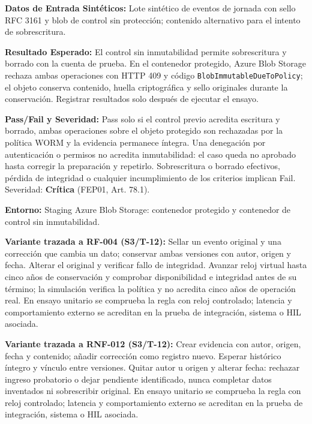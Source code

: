 \par\noindent\textbf{Datos de Entrada Sintéticos:} Lote sintético de eventos de jornada con sello RFC 3161 y blob de control sin protección; contenido alternativo para el intento de sobrescritura.\par
\par\noindent\textbf{Resultado Esperado:} El control sin inmutabilidad permite sobrescritura y borrado con la cuenta de prueba. En el contenedor protegido, Azure Blob Storage rechaza ambas operaciones con HTTP 409 y código \texttt{Blob\allowbreak{}Immutable\allowbreak{}Due\allowbreak{}To\allowbreak{}Policy}; el objeto conserva contenido, huella criptográfica y sello originales durante la conservación. Registrar resultados solo después de ejecutar el ensayo.\par
\par\noindent\textbf{Pass/Fail y Severidad:} Pass solo si el control previo acredita escritura y borrado, ambas operaciones sobre el objeto protegido son rechazadas por la política WORM y la evidencia permanece íntegra. Una denegación por autenticación o permisos no acredita inmutabilidad: el caso queda no aprobado hasta corregir la preparación y repetirlo. Sobrescritura o borrado efectivos, pérdida de integridad o cualquier incumplimiento de los criterios implican Fail. Severidad: \textbf{Crítica} (FEP01, Art. 78.1).\par
\par\noindent\textbf{Entorno:} Staging Azure Blob Storage: contenedor protegido y contenedor de control sin inmutabilidad.\par




\par\noindent\textbf{Variante trazada a RF-004 (S3/T-12):} Sellar un evento original y una corrección que cambia un dato; conservar ambas versiones con autor, origen y fecha. Alterar el original y verificar fallo de integridad. Avanzar reloj virtual hasta cinco años de conservación y comprobar disponibilidad e integridad antes de su término; la simulación verifica la política y no acredita cinco años de operación real. En ensayo unitario se comprueba la regla con reloj controlado; latencia y comportamiento externo se acreditan en la prueba de integración, sistema o HIL asociada.\par

\par\noindent\textbf{Variante trazada a RNF-012 (S3/T-12):} Crear evidencia con autor, origen, fecha y contenido; añadir corrección como registro nuevo. Esperar histórico íntegro y vínculo entre versiones. Quitar autor u origen y alterar fecha: rechazar ingreso probatorio o dejar pendiente identificado, nunca completar datos inventados ni sobrescribir original. En ensayo unitario se comprueba la regla con reloj controlado; latencia y comportamiento externo se acreditan en la prueba de integración, sistema o HIL asociada.\par

